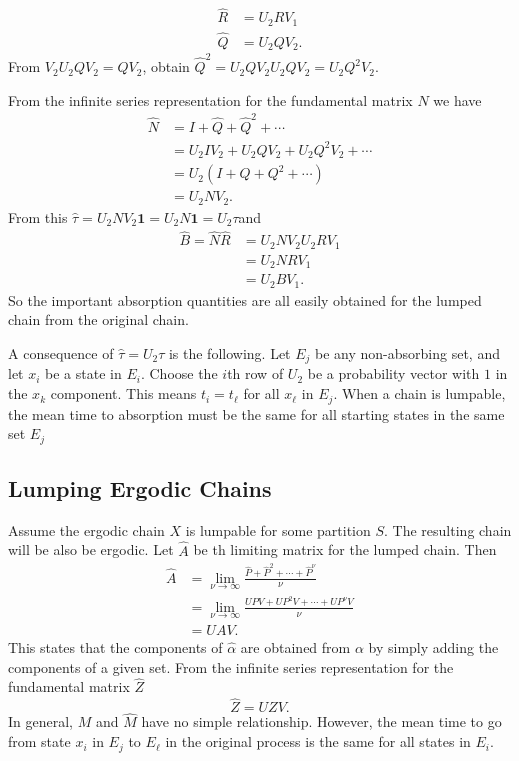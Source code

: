 \documentclass[12pt]{article}
\begin{document}
\begin{align*}
    \hat{R} &= U_2 R V_1 \\
    \hat{Q} &= U_2 Q V_2.
\end{align*}
From \( V_2 U_2 Q V_2 = Q V_2 \), obtain \( \hat{Q}^2 = U_2 Q V_2 U_2 Q
V_2 = U_2 Q^2 V_2 \).

From the infinite series representation for the fundamental matrix \( N \)
we have
\begin{align*}
    \hat{N} &= I + \hat{Q} + \hat{Q}^2 + \cdots \\
    &= U_2 I V_2+ U_2 Q V_2 + U_2 Q^2 V_2 + \cdots \\
    &= U_2 (I + Q + Q^2 + \cdots) \\
    &= U_2 N V_2.
\end{align*}
From this \( \hat{\tau} = U_2 N V_2 \mathbf{1} = U_2 N \mathbf{1} = U_2
\tau \)and
\begin{align*}
    \hat{B} = \hat{N} \hat{R} &= U_2 N V_2 U_2 R V_1 \\
    &= U_2 N R V_1 \\
    &= U_2 B V_1.
\end{align*}
So the important absorption quantities are all easily obtained for the
lumped chain from the original chain.

A consequence of \( \hat{\tau} = U_2 \tau \) is the following. Let \( E_j
\) be any non-absorbing set, and let \( x_i \) be a state in \( E_i \).
Choose the \( i \)th row of \( U_2 \) be a probability vector with \( 1 \)
in the \( x_k \) component.  This means \( t_i = t_\ell \) for all \( x_\ell
\) in \( E_j \).  When a chain is lumpable, the mean time to absorption
must be the same for all starting states in the same set \( E_j \)

\subsection*{Lumping Ergodic Chains}

Assume the ergodic chain \( X \) is lumpable for some partition \( S \).
The resulting chain will be also be ergodic.  Let \( \hat{A} \) be th
limiting matrix for the lumped chain.  Then
\begin{align*}
    \hat{A} &= \lim_{\nu \to \infty} \frac{\hat{P} + \hat{P}^2 + \cdots
    + \hat{P}^{\nu}}{\nu} \\
    &= \lim_{\nu \to \infty} \frac{UPV + UP^2V + \cdots + UP^{\nu}V}{\nu}
    \\
    & = UAV.
\end{align*}
This states that the components of \( \hat{\alpha} \) are obtained from \(
\alpha \) by simply adding the components of a given set.  From the
infinite series representation for the fundamental matrix \( \hat{Z} \)
\[
    \hat{Z} = U Z V.
\] In general, \( M \) and \( \hat{M} \) have no simple relationship.
However, the mean time to go from state \( x_i \) in \( E_j \) to \( E_{\ell}
\) in the original process is the same for all states in \( E_i \).
\end{document}
